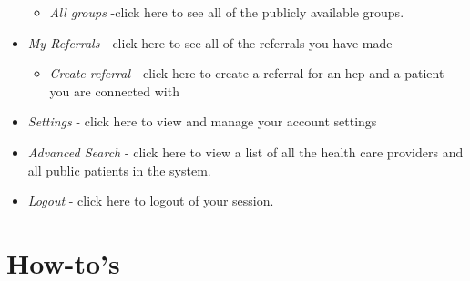 \begin{itemize}
\begin{itemize}
\item \textit{All groups} -click here to see all of the publicly available groups.
\end{itemize}
\item \textit{My Referrals} - click here to see all of the referrals you have made
\begin{itemize}
\item \textit{Create referral} - click here to create a referral for an hcp and a patient you are connected with
\end{itemize}
\item \textit{Settings} - click here to view and manage your account settings
\item \textit{Advanced Search} - click here to view a list of all the health care providers and all public patients in the system.
\item \textit{Logout} - click here to logout of your session.
\end{itemize}


\section{How-to's}

